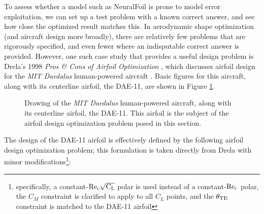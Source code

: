 \documentclass[conf]{new-aiaa}
\begin{document}
    To assess whether a model such as NeuralFoil is prone to model error exploitation, we can set up a test problem with a known correct answer, and see how close the optimized result matches this. In aerodynamic shape optimization (and aircraft design more broadly), there are relatively few problems that are rigorously specified, and even fewer where an indisputable correct answer is provided. However, one such case study that provides a useful design problem is Drela's 1998 \textit{Pros \& Cons of Airfoil Optimization} \cite{drela_pros_1998}, which discusses airfoil design for the \emph{MIT Daedalus} human-powered aircraft \cite{langford_feasibility_1986, langford_daedalus_1989, drela_humanpowered_1985}. Basic figures for this aircraft, along with its centerline airfoil, the DAE-11, are shown in Figure \ref{fig:daedalus_iso}.

    \begin{figure}[h]
        \centering
        
        \caption{Drawing of the \emph{MIT Daedalus} human-powered aircraft, along with its centerline airfoil, the DAE-11. This airfoil is the subject of the airfoil design optimization problem posed in this section.}
        \label{fig:daedalus_iso}
    \end{figure}

    The design of the DAE-11 airfoil is effectively defined by the following airfoil design optimization problem; this formulation is taken directly from Drela \cite{drela_pros_1998} with minor modifications\footnote{specifically, a constant-$\rm Re_c \sqrt{C_L}$ polar is used instead of a constant-$\rm Re_c$ polar, the $C_M$ constraint is clarified to apply to all $C_L$ points, and the $\theta_{\rm TE}$ constraint is matched to the DAE-11 airfoil}:
\end{document}
